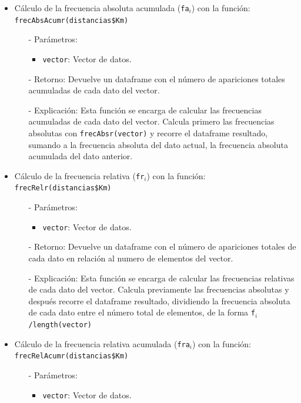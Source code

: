 \documentclass[a4paper, 12pt]{article}
\begin{document}
\begin{itemize}
		\item Cálculo de la frecuencia absoluta acumulada (\texttt{fa$_{i}$}) con la función: \texttt{frecAbsAcumr(distancias\$Km)}
		\begin{itemize}
			\item[-] Parámetros: 
			\begin{itemize}
				\item \texttt{vector}: Vector de datos.
			\end{itemize}
			
			\item[-] Retorno: Devuelve un dataframe con el número de apariciones totales acumuladas de cada dato del vector. 
			
			\item[-] Explicación: Esta función se encarga de calcular las frecuencias acumuladas de cada dato del vector. Calcula primero las frecuencias absolutas con \texttt{frecAbsr(vector)} y recorre el dataframe resultado, sumando a la frecuencia absoluta del dato actual, la frecuencia absoluta acumulada del dato anterior.
		\end{itemize}
		
		\item Cálculo de la frecuencia relativa (\texttt{fr$_{i}$}) con la función: \texttt{frecRelr(distancias\$Km)}
		\begin{itemize}
			\item[-] Parámetros: 
			\begin{itemize}
				\item \texttt{vector}: Vector de datos.
			\end{itemize}
			
			\item[-] Retorno: Devuelve un dataframe con el número de apariciones totales de cada dato en relación al numero de elementos del vector. 
			
			\item[-] Explicación: Esta función se encarga de calcular las frecuencias relativas de cada dato del vector. Calcula previamente las frecuencias absolutas y después recorre el dataframe resultado, dividiendo la frecuencia absoluta de cada dato entre el número total de elementos, de la forma \texttt{f$_{i}$/length(vector)}
		\end{itemize}
		
		\item Cálculo de la frecuencia relativa acumulada (\texttt{fra$_{i}$}) con la función: \texttt{frecRelAcumr(distancias\$Km)}
		\begin{itemize}
			\item[-] Parámetros: 
			\begin{itemize}
				\item \texttt{vector}: Vector de datos.
			\end{itemize}
			

\end{itemize}
\end{itemize}
\end{document}
